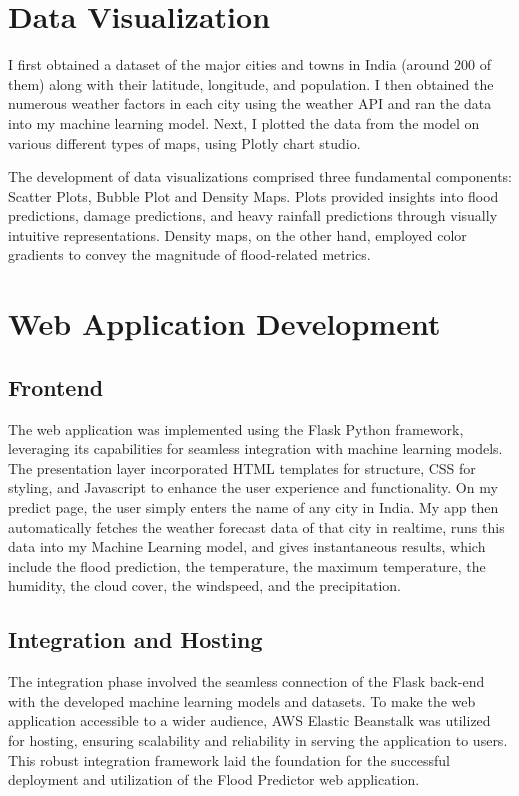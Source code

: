 \documentclass[a4paper,12pt]{report}
\begin{document}
\section{Data Visualization}

I first obtained a dataset of the major cities and towns in India (around 200 of them) along with their latitude, longitude, and population. I then obtained the numerous weather factors in each city using the weather API and ran the data into my machine learning model. Next, I plotted the data from the model on various different types of maps, using Plotly chart studio.

The development of data visualizations comprised three fundamental components: Scatter Plots, Bubble Plot and Density Maps. Plots provided insights into flood predictions, damage predictions, and heavy rainfall predictions through visually intuitive representations. Density maps, on the other hand, employed color gradients to convey the magnitude of flood-related metrics.

\section{Web Application Development}

\subsection{Frontend}
The web application was implemented using the Flask Python framework, leveraging its capabilities for seamless integration with machine learning models. The presentation layer incorporated HTML templates for structure, CSS for styling, and Javascript to enhance the user experience and functionality.
On my predict page, the user simply enters the name of any city in India. My app then automatically fetches the weather forecast data of that city in realtime, runs this data into my Machine Learning model, and gives instantaneous results, which include the flood prediction, the temperature, the maximum temperature, the humidity, the cloud cover, the windspeed, and the precipitation.

\subsection{Integration and Hosting}
The integration phase involved the seamless connection of the Flask back-end with the developed machine learning models and datasets. To make the web application accessible to a wider audience, AWS Elastic Beanstalk was utilized for hosting, ensuring scalability and reliability in serving the application to users. This robust integration framework laid the foundation for the successful deployment and utilization of the Flood Predictor web application.
\end{document}
